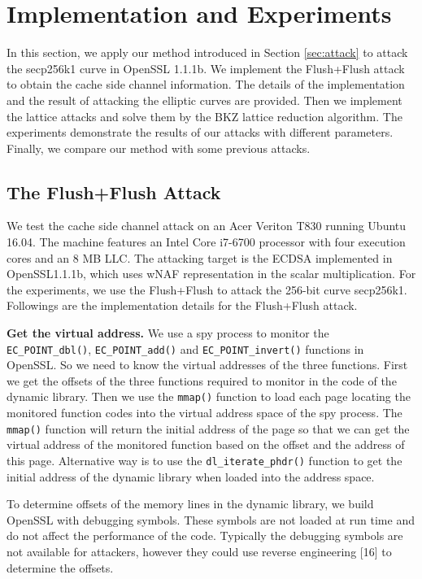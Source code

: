 \section{Implementation and Experiments}
\label{sec:impl&exper}
In this section, we apply our method introduced in Section \ref{sec:attack} to attack the secp256k1 curve in OpenSSL 1.1.1b.
  We implement the Flush+Flush attack  to obtain
the cache side channel information.
The details of the implementation and the result of attacking the elliptic curves are provided.
Then we implement the lattice attacks and solve them by the BKZ lattice reduction algorithm.
 The experiments demonstrate the results of our attacks with different parameters.
Finally, we compare our method with some previous attacks.


\subsection{The Flush+Flush Attack}
\label{ffattack}
We test the cache side channel attack on an Acer Veriton T830 running Ubuntu 16.04.
The machine features an Intel Core i7-6700 processor with four execution cores and an $8$ MB LLC.
The attacking target is the ECDSA implemented in OpenSSL1.1.1b, which uses wNAF representation in the scalar multiplication.
For the experiments, we use the Flush+Flush to attack the 256-bit curve secp256k1.
Followings are the implementation details for the Flush+Flush attack.


\noindent\textbf{Get the virtual address. }
We use a spy process to monitor the  \verb+EC_POINT_dbl()+,  \verb+EC_POINT_add()+ and \verb+EC_POINT_invert()+ functions in OpenSSL.
So we need to know the virtual addresses of the three functions.
First we get the offsets of the three functions required to monitor in the code of the dynamic library.
Then we use the \verb+mmap()+ function to load each page locating the monitored function codes into the virtual address space of the spy process.
The \verb+mmap()+ function will return the initial address of the page so that we can get the virtual address of the monitored function based on the offset and the address of this page.
Alternative way is to use the \verb+dl_iterate_phdr()+ function to get the initial address of the dynamic library when loaded into the address space.

To determine offsets of the memory lines in the  dynamic library,  we build OpenSSL with debugging symbols.
 These symbols are not loaded at run time and do not affect the performance of the code.
Typically the debugging symbols are not available for attackers,
 however they could use reverse engineering [16] to determine the offsets.



